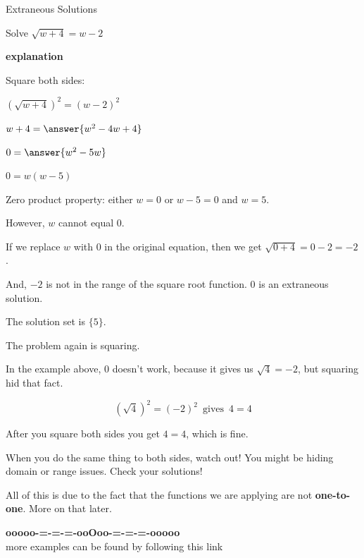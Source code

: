 \documentclass{ximera}
\begin{document}
\begin{example} Extraneous Solutions

Solve $\sqrt{w+4} = w - 2$


\textbf{\textcolor{red!75!green}{explanation}} 

Square both sides:



$(\sqrt{w+4})^2 = (w - 2)^2$


$w + 4 = \answer{w^2 - 4w + 4}$


$0 = \answer{w^2 - 5w}$

$0 = w(w-5) $


Zero product property:  either $w=0$ or $w-5=0$ and $w=5$.



However, $w$ cannot equal $0$.  

If we replace $w$ with $0$ in the original equation, then we get $\sqrt{0+4} = 0 - 2 = -2$.

And, $-2$ is not in the range of the square root function. $0$ is an extraneous solution.

The solution set is $\{ 5 \}$.


\end{example}


The problem again is squaring.

In the example above, $0$ doesn't work, because it gives us $\sqrt{4} = -2$, but squaring hid that fact.  


\[ (\sqrt{4})^2 = (-2)^2 \, \text{ gives } \, 4 = 4\]


After you square both sides you get $4 = 4$, which is fine.





When you do the same thing to both sides, watch out!  You might be hiding domain or range issues.  Check your solutions! 




All of this is due to the fact that the functions we are applying are not \textbf{one-to-one}.  More on that later.















\begin{center}
\textbf{\textcolor{green!50!black}{ooooo-=-=-=-ooOoo-=-=-=-ooooo}} \\

more examples can be found by following this link\\ 

\end{center}
\end{document}
